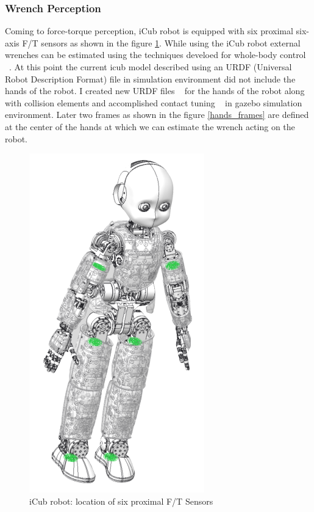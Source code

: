 \documentclass[12pt,a4paper]{report}
\begin{document}
\subsubsection*{Wrench Perception}
Coming to force-torque perception, iCub robot is equipped with six proximal six-axis F/T sensors as shown in the figure \ref{icub_ft}. While using the iCub robot external wrenches can be estimated using the techniques develoed for whole-body control ~\cite{nori2015icub}. At this point the current icub model described using an URDF (Universal Robot Description Format) file in simulation environment did not include the hands of the robot. I created new URDF files ~\cite{icub_hands_urdf} for the hands of the robot along with collision elements and accomplished contact tuning ~\cite{icub_hands_contact_tuning} in gazebo simulation environment. Later two frames as shown in the figure \ref{hands_frames} are defined at the center of the hands at which we can estimate the wrench acting on the robot. 

\begin{figure}[H]
  \centering
  \includegraphics[scale=0.5]{figures/icub_ft.png}
  \caption{iCub robot: location of six proximal F/T Sensors}
  \label{icub_ft}
\end{figure}
\end{document}

